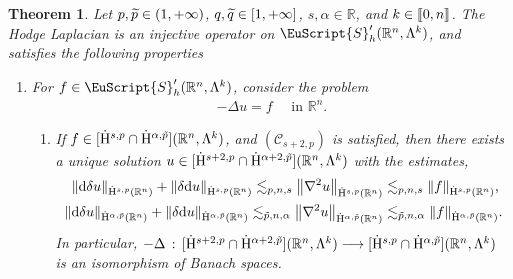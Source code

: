 \documentclass[10pt]{amsart}
\newtheorem{theo}{Theorem}[section]
\theoremstyle{definition}\newtheorem{defi}[theo]{Definition}\newtheorem{rema}[theo]{Remark}\newtheorem{exam}[theo]{Example}\newtheorem{exem}[theo]{Example}\newtheorem{nota}[theo]{Notation}
\newcommand{\bbR}{\mathbb{R}}
\newcommand{\rmH}{\mathrm{H}}%
\newcommand{\rmd}{\mathrm{d}}
\newcommand{\clC}{\mathcal{C}}
\newcommand{\eus}{\EuScript}
\newcommand{\llbracket}{\mathopen{[\mkern -2.7mu[}}
\newcommand{\rrbracket}{\mathclose{]\mkern -2.7mu]}}
\newcommand{\llb}{\llbracket}
\newcommand{\rrb}{\rrbracket}
\newcommand*{\romanenumi}{\renewcommand*{\theenumi}{\roman{enumi}}}
\let\oldtilde\tilde
\renewcommand*{\tilde}[1]{\mathchoice{\widetilde{#1}}{\widetilde{#1}}{\oldtilde{#1}}{\oldtilde{#1}}}
\begin{document}
\begin{theo}\label{thm:MetaThm1LaplacianRn}
Let $p,\Tilde{p}\in(1,+\infty)$, $q,\Tilde{q}\in[1,+\infty]$, $s,\alpha\in\bbR$, and $k\in\llb 0,n\rrb$. The Hodge Laplacian is an injective operator on $\eus{S}'_h(\bbR^n,\Lambda^k)$, and satisfies the following properties
\begin{enumerate}\romanenumi
\item\label{theo2.7.1} For $f\in \eus{S}'_h(\bbR^n,\Lambda^k)$, consider the problem
\begin{align*}
- \Delta u = f\quad\text{ in } \bbR^n.
\end{align*}
\begin{enumerate}
\item\label{theo2.7.1.a} If $f\in [\dot{\rmH}^{s,p}\cap \dot{\rmH}^{\alpha,\tilde{p}}](\bbR^n,\Lambda^k)$, and $(\clC_{s+2,p})$ is satisfied, then there exists a unique solution $u\in [\dot{\rmH}^{s+2,p}\cap \dot{\rmH}^{\alpha+2,\tilde{p}}](\bbR^n,\Lambda^k)$ with the estimates,
\begin{align*}
\| \rmd\delta u\|_{\dot{\rmH}^{s,p}(\bbR^n)} + \| \delta\rmd u\|_{\dot{\rmH}^{s,p}(\bbR^n)} \lesssim_{p,n,s} \left\| \nabla^2 u\right\|_{\dot{\rmH}^{s,p}(\bbR^n)} &\lesssim_{p,n,s} \| f\|_{\dot{\rmH}^{s,p}(\bbR^n)}\text{,}\\
\| \rmd\delta u\|_{\dot{\rmH}^{\alpha,\tilde{p}}(\bbR^n)} + \| \delta\rmd u\|_{\dot{\rmH}^{\alpha,\tilde{p}}(\bbR^n)} \lesssim_{\tilde{p},n,\alpha} \left\| \nabla^2 u\right\|_{\dot{\rmH}^{\alpha,\tilde{p}}(\bbR^n)} &\lesssim_{\tilde{p},n,\alpha} \| f\|_{\dot{\rmH}^{\alpha,\tilde{p}}(\bbR^n)} .
\end{align*}
In particular, $-\Delta\,:\,[\dot{\rmH}^{s+2,p}\cap \dot{\rmH}^{\alpha+2,\tilde{p}}](\bbR^n,\Lambda^k)\longrightarrow [\dot{\rmH}^{s,p}\cap \dot{\rmH}^{\alpha,\tilde{p}}](\bbR^n,\Lambda^k)$ is an isomorphism of Banach spaces.


\end{enumerate}
\end{enumerate}
\end{theo}
\end{document}
